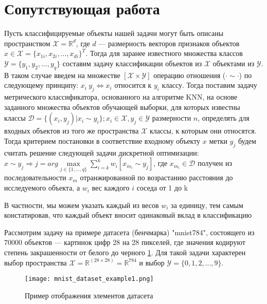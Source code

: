 \documentclass{article}
\begin{document}
\section{Сопутствующая работа}
    Пусть классифицируемые объекты нашей задачи могут быть описаны пространством $\mathcal{X} = \mathds{R}^{d}$, где $d$ — размерность векторов признаков объектов $x \in \mathcal{X} = \{x_{1i}, x_{2i}, ..., x_{di}\}^T$. Тогда для заранее известного множества классов $\mathcal{Y} = \{y_1, y_2, ..., y_q\}$ составим задачу классификации объектов из $\mathcal{X}$ объектами из $\mathcal{Y}$. В таком случае введем на множестве $[\mathcal{X} \times \mathcal{Y}]$ операцию отношения ($\cdot \sim \cdot$) по следующему принципу: $x_i ~ y_j \Longleftrightarrow x_i$ относится к $y_i$ классу. Тогда поставим задачу метрического классификатора, основанного на алгоритме KNN, на основе заданного множества объектов обучающей выборки, для которых известны классы $\mathcal{D} = \{(x_i, y_j) | x_i \sim y_i\}; x_i \in \mathcal{X}, y_j \in \mathcal{Y}$  размерности $n$, определять для входных объектов из того же пространства $\mathcal{X}$ классы, к которым они относятся. 
    Тогда критерием постановки в соответствие входному объекту $x$ метки $y_j$ будем считать решение следующей задачи дискретной оптимизации:
    $\hat{x} \sim y_j \Rightarrow j = arg \max\limits_{j \in \{1, ..., q\}}\sum_{i=k}^{k}w_i[x_{m_i} \sim y_j]$, где $x_{m_i} \in \mathcal{D}$ получен из последовательности  $x_m$ отранжированной по возрастанию расстояния до исследуемого объекта, а $w_i$ вес каждого $i$ соседа от 1 до k

    \begin{leftrule}
        В частности, мы можем указать каждый из весов $w_i$ за единицу, тем самым констатировав, что каждый объект вносит одинаковый вклад в классификацию 
    \end{leftrule}

    Рассмотрим задачу на примере датасета (бенчмарка) "mnist784", состоящего из 70000 объектов — картинок цифр 28 на 28 пикселей, где значения кодируют степень закрашенности от белого до черного \ref{fig:mnist_example_ref}. Для такой задачи характерен выбор пространства $\mathcal{X} = \mathds{R}^{(28 \times 28)} = \mathds{R}^{784}$ и выбор $\mathcal{Y} = \{0, 1, 2, ..., 9\}$.  

    \begin{figure}[h]
        \centering
        \texttt{[image: mnist\_dataset\_example1.png]}
        \caption{Пример отображения элементов датасета}
        \label{fig:mnist_example_ref}
    \end{figure}
\end{document}
